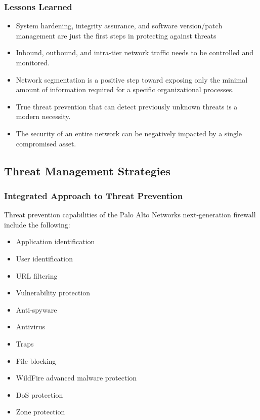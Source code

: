 \subsubsection{Lessons Learned}
\begin{itemize}
    \item System hardening, integrity assurance, and software version/patch management are just the first steps in protecting against threats
    \item Inbound, outbound, and intra-tier network traffic needs to be controlled and monitored.
    \item Network segmentation is a positive step toward exposing only the minimal amount of information required for a specific organizational processes.
    \item True threat prevention that can detect previously unknown threats is a modern necessity.
    \item The security of an entire network can be negatively impacted by a single compromised asset.
\end{itemize}

\subsection{Threat Management Strategies}
\subsubsection{Integrated Approach to Threat Prevention}
Threat prevention capabilities of the Palo Alto Networks next-generation firewall include the following:
\begin{itemize}
    \item Application identification
    \item User identification
    \item URL filtering
    \item Vulnerability protection
    \item Anti-spyware
    \item Antivirus
    \item Traps
    \item File blocking
    \item WildFire advanced malware protection
    \item DoS protection
    \item Zone protection
\end{itemize}

